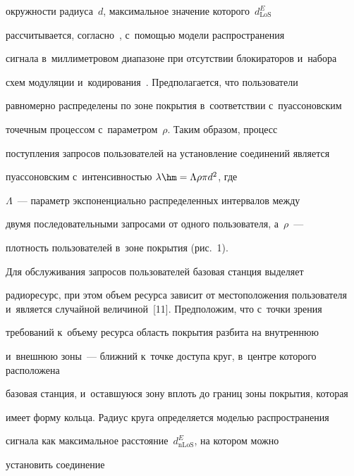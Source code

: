 окружности радиуса~$d$, максимальное значение которого~$d^E_{\mathrm{LoS}}$ 


рассчитывается, согласно~\cite{2-bs}, с~по\-мощью модели распространения 


сигнала в~миллиметровом диапазоне при отсутствии блокираторов и~набора 


схем модуляции и~кодирования~\cite{1-bs}. Предполагается, что пользователи 


равномерно распределены по зоне покрытия в~соответствии с~пуассоновским 


точечным процессом с~параметром~$\rho$. Таким образом, процесс 


поступления запросов пользователей на установление соединений является 


пуассоновским с~интенсивностью $\lambda\hm= \Lambda \rho \pi d^2$, где 


$\Lambda$~--- параметр экспоненциально распределенных интервалов между 


двумя последовательными запросами от одного пользователя, а~$\rho$~--- 


плотность пользователей в~зоне покрытия (рис.~1).


  





  


  Для обслуживания запросов пользователей базовая станция выделяет 


радиоресурс, при этом объем ресурса зависит от местоположения пользователя и~является случайной величиной~[11]. Предположим, что с~точки зрения 


требований к~объему ресурса область покрытия разбита на внутреннюю 


и~внешнюю зоны~--- ближний к~точке доступа круг, в~центре которого расположена 


базовая станция, и~оставшуюся зону вплоть до границ зоны покрытия, которая 


имеет форму кольца. Радиус круга определяется моделью распространения 


сигнала как максимальное расстояние~$d^E_{\mathrm{nLoS}}$, на котором можно 


установить соединение\linebreak\vspace*{-12pt}





\pagebreak





